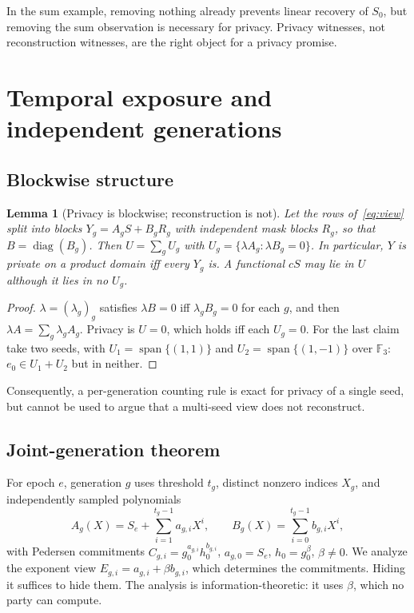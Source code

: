 \documentclass[pdflatex,sn-mathphys-num]{sn-jnl}%
\theoremstyle{plain}
\newtheorem{lemma}[theorem]{Lemma}
\theoremstyle{definition}
\newcommand{\F}{\mathbb{F}}
\begin{document}
In the sum example, removing nothing already prevents linear recovery of $S_0$, but removing the sum observation is necessary for privacy. Privacy witnesses, not reconstruction witnesses, are the right object for a privacy promise.


\section{Temporal exposure and independent generations}\label{sec:temporal}

\subsection{Blockwise structure}
\begin{lemma}[Privacy is blockwise; reconstruction is not]\label{lem:block}
Let the rows of~\eqref{eq:view} split into blocks $Y_g=A_gS+B_gR_g$ with independent mask blocks $R_g$, so that $B=\operatorname{diag}(B_g)$. Then $U=\sum_gU_g$ with $U_g=\{\lambda A_g:\lambda B_g=0\}$. In particular, $Y$ is private on a product domain iff every $Y_g$ is. A functional $cS$ may lie in $U$ although it lies in no $U_g$.
\end{lemma}
\begin{proof}
$\lambda=(\lambda_g)_g$ satisfies $\lambda B=0$ iff $\lambda_gB_g=0$ for each $g$, and then $\lambda A=\sum_g\lambda_gA_g$. Privacy is $U=0$, which holds iff each $U_g=0$. For the last claim take two seeds, with $U_1=\operatorname{span}\{(1,1)\}$ and $U_2=\operatorname{span}\{(1,-1)\}$ over $\F_3$: $e_0\in U_1+U_2$ but in neither.
\end{proof}

Consequently, a per-generation counting rule is exact for privacy of a single seed, but cannot be used to argue that a multi-seed view does not reconstruct.

\subsection{Joint-generation theorem}
For epoch $e$, generation $g$ uses threshold $t_g$, distinct nonzero indices $X_g$, and independently sampled polynomials
\begin{equation}\label{eq:sharing}
 A_g(X)=S_e+\sum_{i=1}^{t_g-1}a_{g,i}X^i,\qquad
 B_g(X)=\sum_{i=0}^{t_g-1}b_{g,i}X^i,
\end{equation}
with Pedersen commitments $C_{g,i}=g_0^{a_{g,i}}h_0^{b_{g,i}}$, $a_{g,0}=S_e$, $h_0=g_0^\beta$, $\beta\ne0$. We analyze the exponent view $E_{g,i}=a_{g,i}+\beta b_{g,i}$, which determines the commitments. Hiding it suffices to hide them. The analysis is information-theoretic: it uses $\beta$, which no party can compute.
\end{document}
